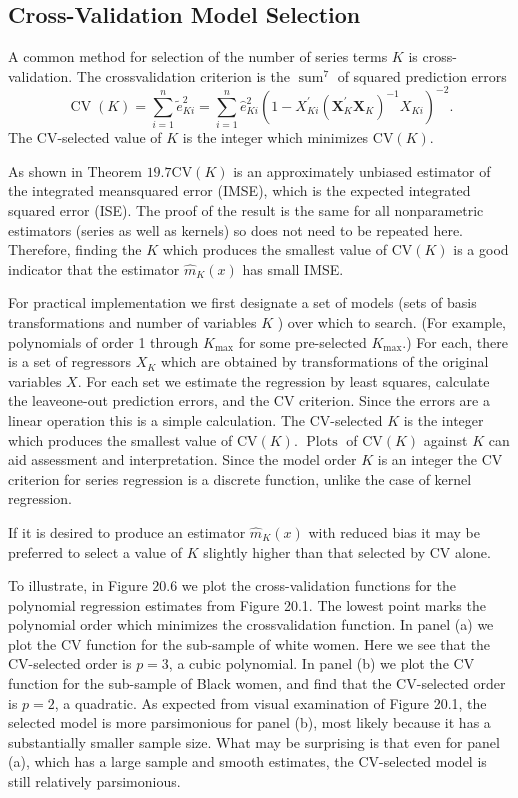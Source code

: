 \documentclass[10pt]{article}
\begin{document}
\subsection{Cross-Validation Model Selection}
A common method for selection of the number of series terms $K$ is cross-validation. The crossvalidation criterion is the $\operatorname{sum}^{7}$ of squared prediction errors
$$
\operatorname{CV}(K)=\sum_{i=1}^{n} \widetilde{e}_{K i}^{2}=\sum_{i=1}^{n} \widehat{e}_{K i}^{2}\left(1-X_{K i}^{\prime}\left(\boldsymbol{X}_{K}^{\prime} \boldsymbol{X}_{K}\right)^{-1} X_{K i}\right)^{-2} .
$$
The CV-selected value of $K$ is the integer which minimizes $\mathrm{CV}(K)$.

As shown in Theorem $19.7 \mathrm{CV}(K)$ is an approximately unbiased estimator of the integrated meansquared error (IMSE), which is the expected integrated squared error (ISE). The proof of the result is the same for all nonparametric estimators (series as well as kernels) so does not need to be repeated here. Therefore, finding the $K$ which produces the smallest value of $\mathrm{CV}(K)$ is a good indicator that the estimator $\widehat{m}_{K}(x)$ has small IMSE.

For practical implementation we first designate a set of models (sets of basis transformations and number of variables $K$ ) over which to search. (For example, polynomials of order 1 through $K_{\max }$ for some pre-selected $K_{\max }$.) For each, there is a set of regressors $X_{K}$ which are obtained by transformations of the original variables $X$. For each set we estimate the regression by least squares, calculate the leaveone-out prediction errors, and the CV criterion. Since the errors are a linear operation this is a simple calculation. The CV-selected $K$ is the integer which produces the smallest value of $\mathrm{CV}(K)$. $\operatorname{Plots}$ of $\mathrm{CV}(K)$ against $K$ can aid assessment and interpretation. Since the model order $K$ is an integer the CV criterion for series regression is a discrete function, unlike the case of kernel regression.

If it is desired to produce an estimator $\widehat{m}_{K}(x)$ with reduced bias it may be preferred to select a value of $K$ slightly higher than that selected by CV alone.

To illustrate, in Figure $20.6$ we plot the cross-validation functions for the polynomial regression estimates from Figure 20.1. The lowest point marks the polynomial order which minimizes the crossvalidation function. In panel (a) we plot the CV function for the sub-sample of white women. Here we see that the CV-selected order is $p=3$, a cubic polynomial. In panel (b) we plot the CV function for the sub-sample of Black women, and find that the CV-selected order is $p=2$, a quadratic. As expected from visual examination of Figure 20.1, the selected model is more parsimonious for panel (b), most likely because it has a substantially smaller sample size. What may be surprising is that even for panel (a), which has a large sample and smooth estimates, the CV-selected model is still relatively parsimonious.
\end{document}
